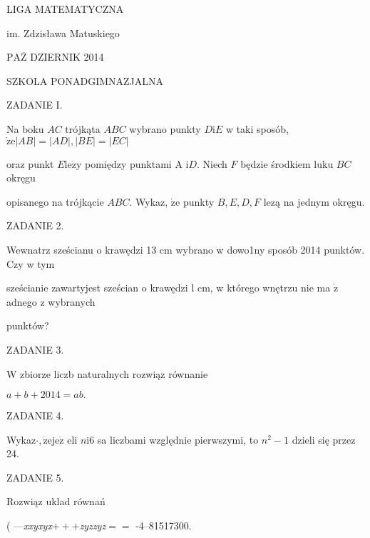 \documentclass[a4paper,12pt]{article}
\begin{document}
LIGA MATEMATYCZNA

im. Zdzisława Matuskiego

$\mathrm{P}\mathrm{A}\overline{\mathrm{Z}}$ DZIERNIK 2014

SZKOLA PONADGIMNAZJALNA

ZADANIE I.

Na boku $AC$ trójkąta $ABC$ wybrano punkty $D\mathrm{i}E$ w taki sposób, $\dot{\mathrm{z}}\mathrm{e}|AB|=|AD|, |BE|=|EC|$

oraz punkt $E \mathrm{l}\mathrm{e}\dot{\mathrm{z}}\mathrm{y}$ pomiędzy punktami A $\mathrm{i} D$. Niech $F$ będzie środkiem luku $BC$ okręgu

opisanego na trójkącie $ABC$. Wykaz, $\dot{\mathrm{z}}\mathrm{e}$ punkty $B, E, D, F$ lezą na jednym okręgu.

ZADANIE 2.

Wewnatrz sześcianu o krawędzi 13 cm wybrano w dowo1ny sposób 2014 punktów. Czy w tym

sześcianie zawartyjest sześcian o krawędzi l cm, w którego wnętrzu nie ma $\dot{\mathrm{z}}$ adnego z wybranych

punktów?

ZADANIE 3.

$\mathrm{W}$ zbiorze liczb naturalnych rozwiąz równanie

$a+b+2014=ab.$

ZADANIE 4.

Wykaz$\cdot, \dot{\mathrm{z}}\mathrm{e}\mathrm{j}\mathrm{e}\dot{\mathrm{z}}$ eli $n\mathrm{i}6$ sa liczbami względnie pierwszymi, to $n^{2}-1$ dzieli się przez 24.

ZADANIE 5.

Rozwiąz uklad równań

( ---{\it xxyxyx}$+++${\it zyzzyz}$==$ -4--81517300.
\end{document}
